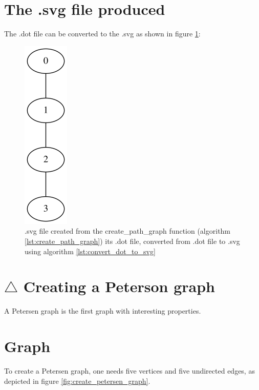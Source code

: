 \section{The .svg file produced}
\label{subsec:create_path_graph.svg}

The .dot file can be converted to the .svg 
as shown in figure \ref{fig:create_path_graph.svg}:

\begin{figure}[!htbp]
  \includegraphics[]{create_path_graph_4.png}
  \caption{
    .svg file created from the create\_path\_graph function 
    (algorithm \ref{lst:create_path_graph}) 
    its .dot file, converted from .dot file to .svg 
    using algorithm \ref{lst:convert_dot_to_svg}
  }
  \label{fig:create_path_graph.svg}
\end{figure}

\section{$\triangle$ Creating a Peterson graph}
\label{subsec:create_petersen_graph}

A Petersen graph is the first graph with interesting properties.

\section{Graph}

To create a Petersen graph, one needs five vertices and five undirected
 edges, as depicted in figure 
\ref{fig:create_petersen_graph}.

